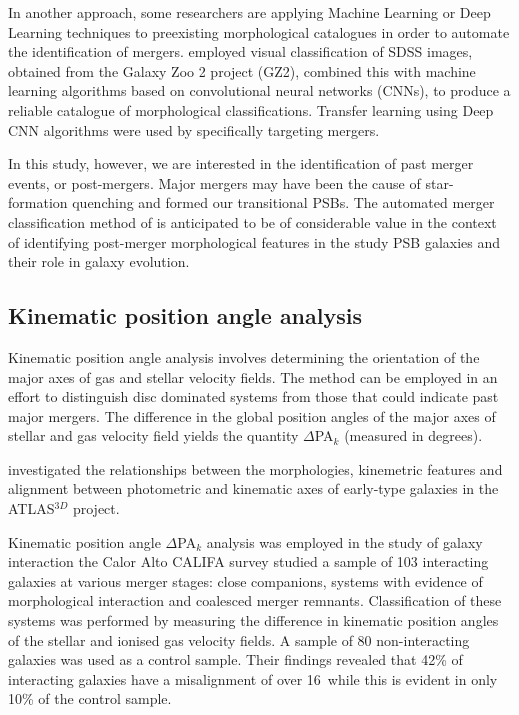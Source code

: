 In another approach, some researchers are applying Machine Learning or Deep Learning techniques to preexisting morphological catalogues in order to automate the identification of mergers. \citet{2018MNRAS.476.3661D} employed visual classification of SDSS images, obtained from the Galaxy Zoo 2 project (GZ2), combined this with machine learning algorithms based on convolutional neural networks (CNNs), to produce a reliable catalogue of  morphological classifications. Transfer learning using Deep CNN algorithms were used by \citet{2018MNRAS.479..415A} specifically targeting mergers. 

In this study, however, we are interested in the identification of past merger events, or post-mergers. Major mergers may have been the cause of star-formation quenching and formed our transitional PSBs. The automated merger classification method of  \cite{2019DDA....5020304N} is anticipated to be of considerable value in the context of identifying post-merger morphological features in the study PSB galaxies and their role in galaxy evolution. 


\subsection{Kinematic position angle analysis}
Kinematic position angle analysis involves determining the orientation of the major axes of gas and stellar velocity fields. The method can be employed in an effort to distinguish disc dominated systems from those that could indicate past major mergers. The difference in the global position angles of the major axes of stellar and gas velocity field yields the quantity $\Delta$PA$_{k}$ (measured in degrees).

\citet{2011MNRAS.414.2923K} investigated the relationships between the morphologies, kinemetric features and alignment between photometric and kinematic axes of early-type galaxies in the ATLAS$^{3D}$ project.

Kinematic position angle $\Delta$PA$_k$ analysis was employed in the study of galaxy interaction the Calor Alto CALIFA survey \citet{2015A&A...582A..21B} studied a sample of 103 interacting galaxies at various merger stages: close companions, systems with evidence of morphological interaction and coalesced merger remnants. Classification of these systems was performed by measuring the difference in kinematic position angles of the stellar and ionised gas velocity fields. A sample of 80 non-interacting galaxies was used as a control sample. Their findings revealed that 42\% of interacting galaxies have a misalignment of over 16\textdegree\ while this is evident in only 10\% of the control sample.

